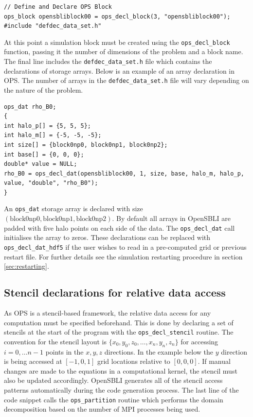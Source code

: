 \documentclass[11pt]{article}
\begin{document}
\begin{lstlisting}
// Define and Declare OPS Block
ops_block opensbliblock00 = ops_decl_block(3, "opensbliblock00");
#include "defdec_data_set.h"
\end{lstlisting}
At this point a simulation block must be created using the \verb|ops_decl_block| function, passing it the number of dimensions of the problem and a block name. The final line includes the \verb|defdec_data_set.h| file which contains the declarations of storage arrays. Below is an example of an array declaration in OPS. The number of arrays in the \verb|defdec_data_set.h| file will vary depending on the nature of the problem.

\begin{lstlisting}
ops_dat rho_B0;
{
int halo_p[] = {5, 5, 5};
int halo_m[] = {-5, -5, -5};
int size[] = {block0np0, block0np1, block0np2};
int base[] = {0, 0, 0};
double* value = NULL;
rho_B0 = ops_decl_dat(opensbliblock00, 1, size, base, halo_m, halo_p, value, "double", "rho_B0");
}
\end{lstlisting}
An \verb|ops_dat| storage array is declared with size $\left(\textrm{block0np0}, \textrm{block0np1}, \textrm{block0np2}\right)$. By default all arrays in OpenSBLI are padded with five halo points on each side of the data. The \verb|ops_decl_dat| call initialises the array to zeros. These declarations can be replaced with \verb|ops_decl_dat_hdf5| if the user wishes to read in a pre-computed grid or previous restart file. For further details see the simulation restarting procedure in section \ref{sec:restarting}.
\subsection{Stencil declarations for relative data access}
As OPS is a stencil-based framework, the relative data access for any computation must be specified beforehand. This is done by declaring a set of stencils at the start of the program with the \verb|ops_decl_stencil| routine. The convention for the stencil layout is $\{x_0, y_0, z_0, \dots,  x_n, y_n, z_n\}$ for accessing $i=0,\dots n-1$ points in the $x,y,z$ directions. In the example below the $y$ direction is being accessed at $[-1, 0, 1]$ grid locations relative to $[0,0,0]$. If manual changes are made to the equations in a computational kernel, the stencil must also be updated accordingly. OpenSBLI generates all of the stencil access patterns automatically during the code generation process. The last line of the code snippet calls the \verb|ops_partition| routine which performs the domain decomposition based on the number of MPI processes being used.
\end{document}

